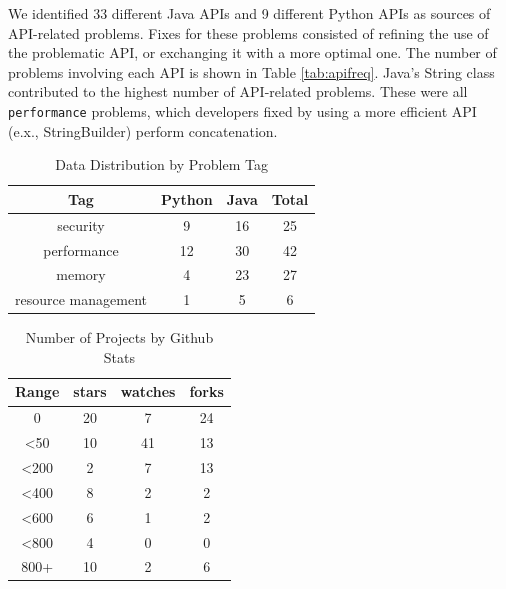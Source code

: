\documentclass[sigconf]{acmart}
\begin{document}
We identified 33 different Java APIs and 9 different Python APIs as sources of API-related problems. Fixes for these problems consisted of refining the use of the problematic API, or exchanging it with a more optimal one. The number of problems involving each API is shown in Table \ref{tab:apifreq}. Java's String class contributed to the highest number of API-related problems. These were all \texttt{performance} problems, which developers fixed by using a more efficient API (e.x., StringBuilder) perform concatenation.
\begin{table}
  \caption{Data Distribution by Problem Tag}
  \label{tab:tag}
\begin{tabular}{  c c c c }
  \toprule
  Tag  				&Python &Java & Total\\
  \midrule
  security				& 9 &16 &25 \\
  performance			&12 &30 &42 \\
  memory				& 4 &23 &27 \\
  resource management	& 1 & 5&  6 \\
  \bottomrule
\end{tabular}
\end{table}

\begin{table}
  \caption{Number of Projects by Github Stats}
  \label{tab:domain}
\begin{tabular}{ c c c c }
  \toprule
  Range & stars & watches & forks\\
  \midrule
  0			&20 & 7& 24\\
  <50		&10 &41& 13\\
  <200	    & 2 & 7& 13\\
  <400	    & 8 & 2&  2\\
  <600   	& 6 & 1&  2\\
  <800      & 4 & 0&  0\\
  800+      & 10& 2&  6\\
  \bottomrule
\end{tabular}
\end{table}
\end{document}

